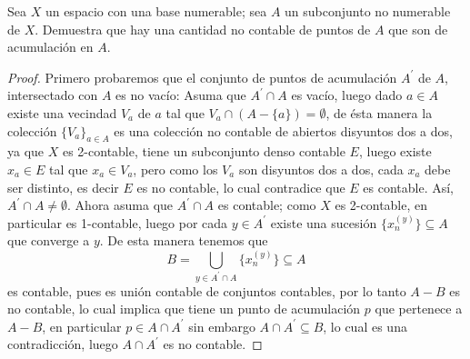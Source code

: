 
\item Sea $X$ un espacio con una base numerable; sea $A$ un subconjunto no numerable de $X$. Demuestra que hay una cantidad no contable de puntos de $A$ que son de acumulación en $A$.

\begin{proof}
    Primero probaremos que el conjunto de puntos de acumulación $A^\prime$ de $A$, intersectado con $A$ es no vacío: Asuma que $A^\prime \cap A$ es vacío, luego dado $a \in A$
    existe una vecindad $V_a$ de $a$ tal que $V_a \cap (A - \{a\}) = \emptyset$, de ésta manera la colección $\{V_a\}_{a \in A}$ es una colección no contable de abiertos disyuntos dos a dos, ya que $X$ es 2-contable, tiene un subconjunto denso contable $E$, luego existe $x_a \in E$ tal que $x_a \in V_a$, pero como los $V_a$ son disyuntos dos a dos, cada $x_a$ debe ser distinto, es decir $E$ es no contable, lo cual contradice que $E$ es contable. Así, $A^\prime \cap A \neq \emptyset$.
    Ahora asuma que $A^\prime \cap A$ es contable; como $X$ es 2-contable, en particular es 1-contable, luego por cada $y \in A^\prime$ existe una sucesión $\{x_n^{(y)}\}  \subseteq A$ que converge a $y$. De esta manera tenemos que
    \begin{equation*}
        B = \bigcup_{y \in A^\prime \cap A} \{x_n^{(y)}\} \subseteq A
    \end{equation*}
    es contable, pues es unión contable de conjuntos contables, por lo tanto $A - B$ es no contable, lo cual implica que tiene un punto de acumulación $p$ que pertenece a $A - B$, en particular $p\in A \cap A^\prime$ sin embargo $A \cap A^\prime \subseteq B$, lo cual es una contradicción, luego $A\cap A^\prime$ es no contable.
\end{proof}